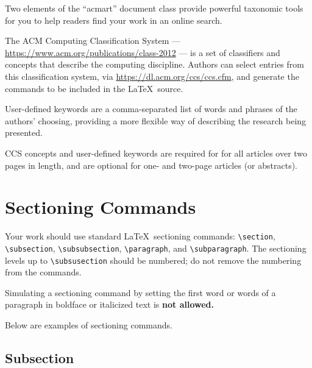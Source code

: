 \documentclass[sigconf,authordraft]{acmart}
\begin{document}
Two elements of the ``acmart'' document class provide powerful
taxonomic tools for you to help readers find your work in an online
search.

The ACM Computing Classification System ---
\url{https://www.acm.org/publications/class-2012} --- is a set of
classifiers and concepts that describe the computing
discipline. Authors can select entries from this classification
system, via \url{https://dl.acm.org/ccs/ccs.cfm}, and generate the
commands to be included in the \LaTeX\ source.

User-defined keywords are a comma-separated list of words and phrases
of the authors' choosing, providing a more flexible way of describing
the research being presented.

CCS concepts and user-defined keywords are required for for all
articles over two pages in length, and are optional for one- and
two-page articles (or abstracts).

\section{Sectioning Commands}

Your work should use standard \LaTeX\ sectioning commands:
\verb|\section|, \verb|\subsection|, \verb|\subsubsection|,
\verb|\paragraph|, and \verb|\subparagraph|. The sectioning levels up to
\verb|\subsusection| should be numbered; do not remove the numbering
from the commands.

Simulating a sectioning command by setting the first word or words of
a paragraph in boldface or italicized text is {\bfseries not allowed.}

Below are examples of sectioning commands.

\subsection{Subsection}
\label{sec:subsection}
\end{document}

